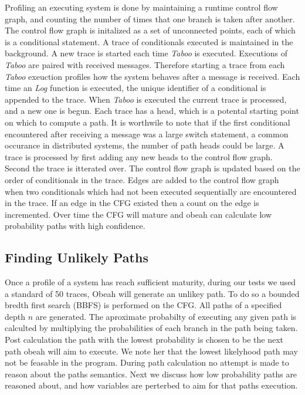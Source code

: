 Profiling an executing system is done by maintaining a runtime control flow
graph, and counting the number of times that one branch is taken after another.
The control flow graph is initalized as a set of unconnected points, each of
which is a conditional statement. A trace of conditionals executed is
maintained in the background. A new trace is started each time \emph{Taboo} is
executed. Executions of \emph{Taboo} are paired with received messages.
Therefore starting a trace from each \emph{Taboo} exeuction profiles how the
system behaves after a message is received. Each time an \emph{Log} function is
executed, the unique identifier of a conditional is appended to the trace. When
\emph{Taboo} is executed the current trace is processed, and a new one is
begun. Each trace has a head, which is a potental starting point on which to
compute a path. It is worthwile to note that if the first conditional
encountered after receiving a message was a large switch statement, a common
occurance in distributed systems, the number of path heads could be large. A
trace is processed by first adding any new heads to the control flow graph.
Second the trace is itterated over. The control flow graph is updated based on
the order of conditionals in the trace. Edges are added to the control flow
graph when two conditionals which had not been executed sequentially are
encountered in the trace. If an edge in the CFG existed then a count on the
edge is incremented. Over time the CFG will mature and obeah can calculate low
probability paths with high confidence.

\subsection{Finding Unlikely Paths}

Once a profile of a system has reach sufficient maturity, during our tests we
used a standard of 50 traces, Obeah will generate an unlikey path. To do so a
bounded bredth first search (BBFS) is performed on the CFG. All paths of a
specified depth $n$ are generated. The aproximate probabilty of executing any
given path is calculted by multiplying the probabilities of each branch in the
path being taken. Post calculation the path with the lowest probability is
chosen to be the next path obeah will aim to execute. We note her that the
lowest likelyhood path may not be feasable in the program. During path
calculation no attempt is made to reason about the paths semantics. Next we
discuss how low probability paths are reasoned about, and how variables are
perterbed to aim for that paths execution.

